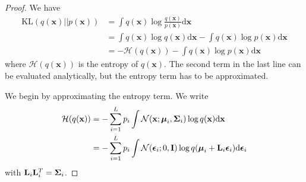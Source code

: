\documentclass{article} %
\newcommand{\N}{\mathcal{N}}
\newcommand{\td}{\text{d}}
\newcommand{\x}{\mathbf{x}}
\newcommand{\bL}{\mathbf{L}}
\newcommand{\I}{\mathbf{I}}
\newcommand{\bepsilon}{\text{\boldmath$\epsilon$}}
\newcommand{\bSigma}{\text{\boldmath$\Sigma$}}
\newcommand{\bmu}{\text{\boldmath$\mu$}}
\newcommand{\KL}{\text{KL}}
\theoremstyle{definition}
\begin{document}
\begin{proof}
We have
\begin{align*}
\KL(q(\x) || p(\x)) &= \int q(\x) \log \frac{q(\x)}{p(\x)} \td \x \\
&= \int q(\x) \log q(\x) \td \x - \int q(\x) \log p(\x) \td \x \\
&= - \mathcal{H}(q(\x)) - \int q(\x) \log p(\x) \td \x
\end{align*}
where $\mathcal{H}(q(\x))$ is the entropy of $q(\x)$. The second term in the last line can be evaluated analytically, but the entropy term has to be approximated.

We begin by approximating the entropy term. We write
\begin{align*}
\mathcal{H}(q(\x)) &= - \sum_{i=1}^L p_i \int \N(\x; \bmu_i, \bSigma_i) \log q(\x) \td \x \\
&= - \sum_{i=1}^L p_i \int \N(\bepsilon_i; 0, \I) \log q(\bmu_i + \bL_i \bepsilon_i) \td \bepsilon_i
\end{align*}
with $\bL_i \bL_i^T = \bSigma_i$.


\end{proof}
\end{document}
